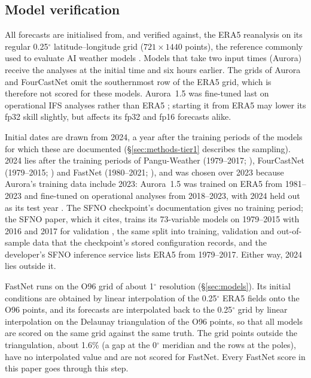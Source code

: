 \subsection{Model verification}
\label{sec:verification-data}

All forecasts are initialised from, and verified against, the ERA5
reanalysis \citep{hersbach2020era5} on its regular 0.25$^\circ$
latitude--longitude grid ($721\times1440$ points), the reference
commonly used to evaluate AI weather models
\citep{rasp2020weatherbench}. Models that take two input times (Aurora)
receive the analyses at the initial time and six hours earlier.
The grids of Aurora and FourCastNet omit the southernmost row of the ERA5
grid, which is therefore not scored for these models. Aurora~1.5 was fine-tuned last on
operational IFS analyses rather than ERA5 \citep{aurora_docs}; starting
it from ERA5 may lower its fp32 skill slightly, but affects its fp32
and fp16 forecasts alike.

Initial dates are drawn from 2024, a year after the training periods of
the models for which these are documented (\S\ref{sec:methods-tier1}
describes the sampling). 2024 lies after the training periods of
Pangu-Weather (1979--2017; \citealp{bi2023pangu}), FourCastNet
(1979--2015; \citealp{pathak2022fourcastnet}) and FastNet (1980--2021;
\citealp{daub2025fastnet}), and was chosen over 2023 because Aurora's
training data include 2023: Aurora~1.5 was trained on ERA5 from
1981--2023 and fine-tuned on operational analyses from 2018--2023, with
2024 held out as its test year \citep{weyn2026aurora15}. The SFNO
checkpoint's documentation gives no training period; the SFNO paper,
which it cites, trains its 73-variable models on 1979--2015 with 2016 and
2017 for validation \citep{bonev2023sfno}, the same split into training,
validation and out-of-sample data that the checkpoint's stored
configuration records, and the developer's SFNO inference service lists ERA5
from 1979--2017. Either way, 2024 lies outside it.

FastNet runs on the O96 grid of about 1$^\circ$ resolution
(\S\ref{sec:models}). Its initial conditions are obtained by linear
interpolation of the 0.25$^\circ$ ERA5 fields onto the O96 points, and
its forecasts are interpolated back to the 0.25$^\circ$ grid by linear
interpolation on the Delaunay triangulation of the O96 points, so that
all models are scored on the same grid against the same truth. The grid
points outside the triangulation, about 1.6\% (a gap at the 0$^\circ$
meridian and the rows at the poles), have no interpolated value and are not
scored for FastNet. Every
FastNet score in this paper goes through this step.


